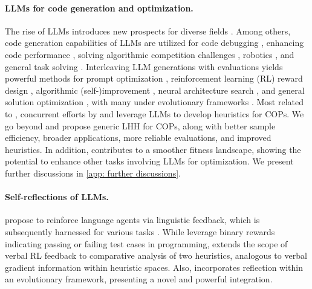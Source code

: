 \paragraph*{LLMs for code generation and optimization.}
The rise of LLMs introduces new prospects for diverse fields \cite{xi2023_llm_agents_survey, wang2023_llm_agents_survey, zhao2023_llm_survey, ji2023ai_alignment, lu2023medkpl, zhang2023proagent}. Among others, code generation capabilities of LLMs are utilized for code debugging \cite{chen2023teaching_llm_to_self_debug, liventsev2023fully_autonomous_programming_llm}, enhancing code performance \cite{madaan2023learning_performance_improving_code_edits}, solving algorithmic competition challenges \cite{li2022competition_level_code_generation_llm, shinn2023reflexion}, robotics \cite{lehman2023evolution_through_llms, liang2023_code_as_policies, wang2023gensim_robotic_llm}, and general task solving \cite{yang2023intercode, zhang2022planning_llm_code_generation}. Interleaving LLM generations with evaluations \cite{song2024position_paper} yields powerful methods for prompt optimization \cite{zhou2022_llm_as_prompt_engineers, wang2023promptagent, guo2023ea_llm_prompt_optimizers}, reinforcement learning (RL) reward design \cite{ma2023eureka}, algorithmic (self-)improvement \cite{zelikman2023stop, liu2023llm_as_evolutionary_optimizer, liu2023_llm_for_moeo}, neural architecture search \cite{chen2023evoprompting_llm_for_nas}, and general solution optimization \cite{yang2023llm_as_optimizers, brooks2023_llm_policy_iteration, wang2023can_llm_solve_graph_problems}, with many under evolutionary frameworks \cite{meyerson2023lm_crossover, wu2024_ec_in_LLM_era, hemberg2024evolving_code_llm, chao2024_consistency_llm_ea, li2024_ea_rl}. Most related to \our{}, concurrent efforts by \citet{liu2024_llm_gls} and \citet{romera2023funsearch} leverage LLMs to develop heuristics for COPs. We go beyond and propose generic LHH for COPs, along with better sample efficiency, broader applications, more reliable evaluations, and improved heuristics. In addition, \our{} contributes to a smoother fitness landscape, showing the potential to enhance other tasks involving LLMs for optimization. We present further discussions in \cref{app: further discussions}.

\paragraph*{Self-reflections of LLMs.}
\citet{shinn2023reflexion} propose to reinforce language agents via linguistic feedback, which is subsequently harnessed for various tasks \cite{madaan2023self-refine,wang2023_reflect_recommendation}. While \citet{shinn2023reflexion} leverage binary rewards indicating passing or failing test cases in programming, \our{} extends the scope of verbal RL feedback to comparative analysis of two heuristics, analogous to verbal gradient information \cite{pryzant2023_prompt_optimization_gd} within heuristic spaces. Also, \our{} incorporates reflection within an evolutionary framework, presenting a novel and powerful integration.

